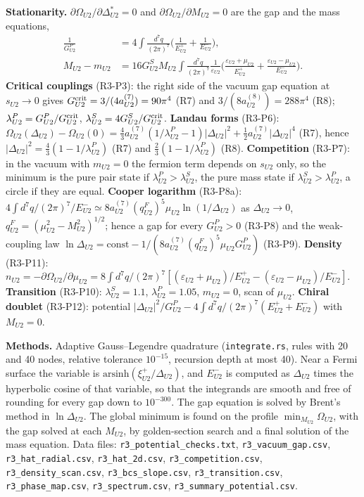 \documentclass[
  10pt,
]{article}
\begin{document}
\textbf{Stationarity.} \(\partial\Omega_{U2}/\partial\Delta^*_{U2}=0\)
and \(\partial\Omega_{U2}/\partial M_{U2}=0\) are the gap and the mass
equations,
\[\begin{aligned}\frac1{G^P_{U2}}&=4\int\frac{d^7q}{(2\pi)^7}\Big(\frac1{E^+_{U2}}+\frac1{E^-_{U2}}\Big),\\
M_{U2}-m_{U2}&=16G^S_{U2}M_{U2}\int\frac{d^7q}{(2\pi)^7}\frac{1}{\varepsilon_{U2}}\Big(\frac{\varepsilon_{U2}+\mu_{U2}}{E^+_{U2}}+\frac{\varepsilon_{U2}-\mu_{U2}}{E^-_{U2}}\Big).\end{aligned}\]
\textbf{Critical couplings} (R3-P3): the right side of the vacuum gap
equation at \(s_{U2}\to0\) gives
\(G^{\rm crit}_{U2}=3/(4a^{(7)}_{U2})=90\pi^4\) (R7) and
\(3/(8a^{(8)}_{U2})=288\pi^4\) (R8);
\(\lambda^P_{U2}=G^P_{U2}/G^{\rm crit}_{U2}\),
\(\lambda^S_{U2}=4G^S_{U2}/G^{\rm crit}_{U2}\). \textbf{Landau forms}
(R3-P6):
\(\Omega_{U2}(\Delta_{U2})-\Omega_{U2}(0)=\tfrac43a^{(7)}_{U2}(1/\lambda^P_{U2}-1)\lvert\Delta_{U2}\rvert^2+\tfrac12a^{(7)}_{U2}\lvert\Delta_{U2}\rvert^4\)
(R7), hence \(\lvert\Delta_{U2}\rvert^2=\tfrac43(1-1/\lambda^P_{U2})\)
(R7) and \(\tfrac23(1-1/\lambda^P_{U2})\) (R8). \textbf{Competition}
(R3-P7): in the vacuum with \(m_{U2}=0\) the fermion term depends on
\(s_{U2}\) only, so the minimum is the pure pair state if
\(\lambda^P_{U2}>\lambda^S_{U2}\), the pure mass state if
\(\lambda^S_{U2}>\lambda^P_{U2}\), a circle if they are equal.
\textbf{Cooper logarithm} (R3-P8a):
\(4\int d^7q/(2\pi)^7/E^-_{U2}\simeq8a^{(7)}_{U2}(q^F_{U2})^5\mu_{U2}\ln(1/\Delta_{U2})\)
as \(\Delta_{U2}\to0\), \(q^F_{U2}=(\mu^2_{U2}-M^2_{U2})^{1/2}\); hence
a gap for every \(G^P_{U2}>0\) (R3-P8) and the weak-coupling law
\(\ln\Delta_{U2}=\text{const}-1/(8a^{(7)}_{U2}(q^F_{U2})^5\mu_{U2}G^P_{U2})\)
(R3-P9). \textbf{Density} (R3-P11):
\(n_{U2}=-\partial\Omega_{U2}/\partial\mu_{U2}=8\int d^7q/(2\pi)^7[(\varepsilon_{U2}+\mu_{U2})/E^+_{U2}-(\varepsilon_{U2}-\mu_{U2})/E^-_{U2}]\).
\textbf{Transition} (R3-P10): \(\lambda^S_{U2}=1.1\),
\(\lambda^P_{U2}=1.05\), \(m_{U2}=0\), scan of \(\mu_{U2}\).
\textbf{Chiral doublet} (R3-P12): potential
\(\lvert\Delta_{U2}\rvert^2/G^P_{U2}-4\int d^7q/(2\pi)^7(E^+_{U2}+E^-_{U2})\)
with \(M_{U2}=0\).

\textbf{Methods.} Adaptive Gauss--Legendre quadrature
(\texttt{integrate.rs}, rules with 20 and 40 nodes, relative tolerance
\(10^{-15}\), recursion depth at most 40). Near a Fermi surface the
variable is \(\mathrm{arsinh}(\xi^+_{U2}/\Delta_{U2})\), and
\(E^-_{U2}\) is computed as \(\Delta_{U2}\) times the hyperbolic cosine
of that variable, so that the integrands are smooth and free of rounding
for every gap down to \(10^{-300}\). The gap equation is solved by
Brent's method in \(\ln\Delta_{U2}\). The global minimum is found on the
profile \(\min_{M_{U2}}\Omega_{U2}\), with the gap solved at each
\(M_{U2}\), by golden-section search and a final solution of the mass
equation. Data files: \texttt{r3\_potential\_checks.txt},
\texttt{r3\_vacuum\_gap.csv}, \texttt{r3\_hat\_radial.csv},
\texttt{r3\_hat\_2d.csv}, \texttt{r3\_competition.csv},
\texttt{r3\_density\_scan.csv}, \texttt{r3\_bcs\_slope.csv},
\texttt{r3\_transition.csv}, \texttt{r3\_phase\_map.csv},
\texttt{r3\_spectrum.csv}, \texttt{r3\_summary\_potential.csv}.
\end{document}
